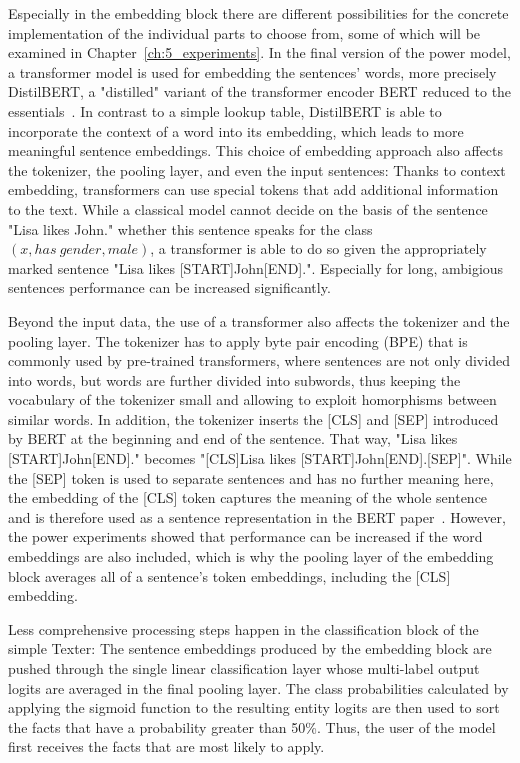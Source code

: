 Especially in the embedding block there are different possibilities for the concrete implementation of the individual parts to choose from, some of which will be examined in Chapter~\ref{ch:5_experiments}. In the final version of the power model, a transformer model is used for embedding the sentences' words, more precisely DistilBERT, a "distilled" variant of the transformer encoder BERT reduced to the essentials~\cite{Sanh2019DistilBERTAD}. In contrast to a simple lookup table, DistilBERT is able to incorporate the context of a word into its embedding, which leads to more meaningful sentence embeddings. This choice of embedding approach also affects the tokenizer, the pooling layer, and even the input sentences: Thanks to context embedding, transformers can use special tokens that add additional information to the text. While a classical model cannot decide on the basis of the sentence "Lisa likes John." whether this sentence speaks for the class $(x, has~gender, male)$, a transformer is able to do so given the appropriately marked sentence "Lisa likes [START]John[END].". Especially for long, ambigious sentences performance can be increased significantly.

Beyond the input data, the use of a transformer also affects the tokenizer and the pooling layer. The tokenizer has to apply byte pair encoding (BPE) that is commonly used by pre-trained transformers, where sentences are not only divided into words, but words are further divided into subwords, thus keeping the vocabulary of the tokenizer small and allowing to exploit homorphisms between similar words. In addition, the tokenizer inserts the [CLS] and [SEP] introduced by BERT at the beginning and end of the sentence. That way, "Lisa likes [START]John[END]." becomes "[CLS]Lisa likes [START]John[END].[SEP]". While the [SEP] token is used to separate sentences and has no further meaning here, the embedding of the [CLS] token captures the meaning of the whole sentence and is therefore  used as a sentence representation in the BERT paper~\cite{Devlin2019BERTPO}. However, the power experiments showed that performance can be increased if the word embeddings are also included, which is why the pooling layer of the embedding block averages all of a sentence's token embeddings, including the [CLS] embedding.

Less comprehensive processing steps happen in the classification block of the simple Texter: The sentence embeddings produced by the embedding block are pushed through the single linear classification layer whose multi-label output logits are averaged in the final pooling layer. The class probabilities calculated by applying the sigmoid function to the resulting entity logits are then used to sort the facts that have a probability greater than 50\%. Thus, the user of the model first receives the facts that are most likely to apply.
